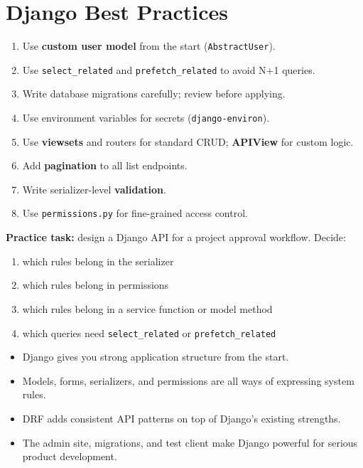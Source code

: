 \documentclass[12pt, a4paper, oneside]{book}
\begin{document}
\section{Django Best Practices}
\begin{enumerate}[leftmargin=2em]
    \item Use \textbf{custom user model} from the start (\texttt{AbstractUser}).
    \item Use \texttt{select\_related} and \texttt{prefetch\_related} to avoid N+1 queries.
    \item Write database migrations carefully; review before applying.
    \item Use environment variables for secrets (\texttt{django-environ}).
    \item Use \textbf{viewsets} and routers for standard CRUD; \textbf{APIView} for custom logic.
    \item Add \textbf{pagination} to all list endpoints.
    \item Write serializer-level \textbf{validation}.
    \item Use \texttt{permissions.py} for fine-grained access control.
\end{enumerate}

\begin{exercisebox}
\textbf{Practice task:} design a Django API for a project approval workflow. Decide:
\begin{enumerate}[leftmargin=2em]
    \item which rules belong in the serializer
    \item which rules belong in permissions
    \item which rules belong in a service function or model method
    \item which queries need \texttt{select\_related} or \texttt{prefetch\_related}
\end{enumerate}
\end{exercisebox}

\begin{summarybox}
\begin{itemize}[leftmargin=2em]
    \item Django gives you strong application structure from the start.
    \item Models, forms, serializers, and permissions are all ways of expressing system rules.
    \item DRF adds consistent API patterns on top of Django's existing strengths.
    \item The admin site, migrations, and test client make Django powerful for serious product development.
\end{itemize}
\end{summarybox}
\end{document}
